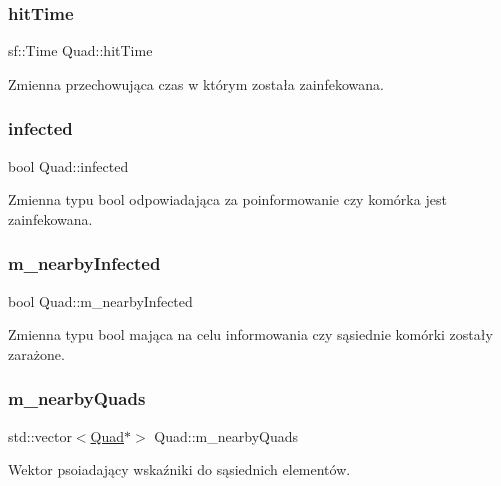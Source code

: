 \subsubsection{\texorpdfstring{hit\+Time}{hitTime}}
{\footnotesize\ttfamily sf\+::\+Time Quad\+::hit\+Time}

Zmienna przechowująca czas w którym została zainfekowana. \mbox{\label{class_quad_ae439ca631a9f51147b9d84a9c9df49c4}} 
\subsubsection{\texorpdfstring{infected}{infected}}
{\footnotesize\ttfamily bool Quad\+::infected}

Zmienna typu bool odpowiadająca za poinformowanie czy komórka jest zainfekowana. \mbox{\label{class_quad_a6ccb745d5e70603957948d681b60e0f8}} 
\subsubsection{\texorpdfstring{m\+\_\+nearby\+Infected}{m\_nearbyInfected}}
{\footnotesize\ttfamily bool Quad\+::m\+\_\+nearby\+Infected\hspace{0.3cm}{\ttfamily [private]}}

Zmienna typu bool mająca na celu informowania czy sąsiednie komórki zostały zarażone. \mbox{\label{class_quad_ad66d1a97fdbecb53ea43af7361b4f124}} 
\subsubsection{\texorpdfstring{m\+\_\+nearby\+Quads}{m\_nearbyQuads}}
{\footnotesize\ttfamily std\+::vector$<$\mbox{\hyperlink{class_quad}{Quad}}$\ast$$>$ Quad\+::m\+\_\+nearby\+Quads\hspace{0.3cm}{\ttfamily [private]}}

Wektor psoiadający wskaźniki do sąsiednich elementów. \mbox{\label{class_quad_a6f4ba6ebde2332f1c4b34661089550e5}} 

